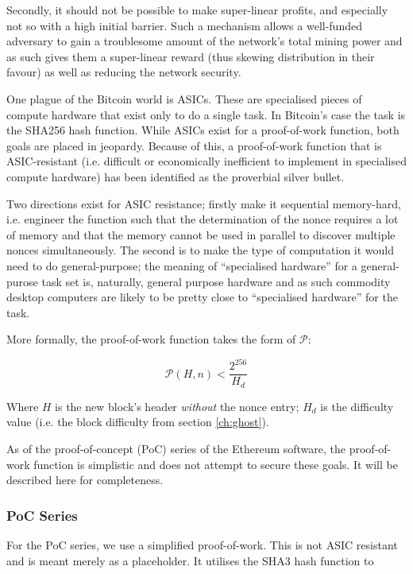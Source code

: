 \documentclass[9pt,oneside]{amsart}
\begin{document}
\begin{multicols}{2}
Secondly, it should not be possible to make super-linear profits, and especially not so with a high initial barrier. Such a mechanism allows a well-funded adversary to gain a troublesome amount of the network's total mining power and as such gives them a super-linear reward (thus skewing distribution in their favour) as well as reducing the network security.

One plague of the Bitcoin world is ASICs. These are specialised pieces of compute hardware that exist only to do a single task. In Bitcoin's case the task is the SHA256 hash function. While ASICs exist for a proof-of-work function, both goals are placed in jeopardy. Because of this, a proof-of-work function that is ASIC-resistant (i.e. difficult or economically inefficient to implement in specialised compute hardware) has been identified as the proverbial silver bullet.

Two directions exist for ASIC resistance; firstly make it sequential memory-hard, i.e. engineer the function such that the determination of the nonce requires a lot of memory and that the memory cannot be used in parallel to discover multiple nonces simultaneously. The second is to make the type of computation it would need to do general-purpose; the meaning of ``specialised hardware''  for a general-purose task set is, naturally, general purpose hardware and as such commodity desktop computers are likely to be pretty close to ``specialised hardware'' for the task. 

More formally, the proof-of-work function takes the form of $\mathcal{P}$:

\begin{equation}
\mathcal{P}(H, n) < \frac{2^{256}}{H_d}
\end{equation}

Where $H$ is the new block's header \textit{without} the nonce entry; $H_d$ is the difficulty value (i.e. the block difficulty from section \ref{ch:ghost}).

As of the proof-of-concept (PoC) series of the Ethereum software, the proof-of-work function is simplistic and does not attempt to secure these goals. It will be described here for completeness.

\subsubsection{PoC Series}

For the PoC series, we use a simplified proof-of-work. This is not ASIC resistant and is meant merely as a placeholder. It utilises the SHA3 hash function to 


\end{multicols}
\end{document}
